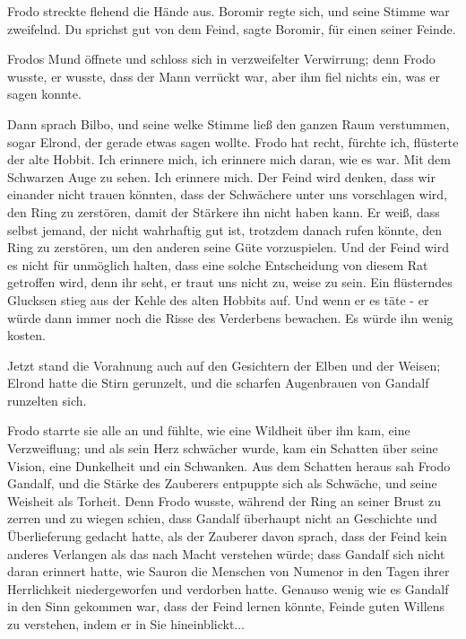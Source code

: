 Frodo streckte flehend die Hände aus. Boromir regte sich, und seine Stimme war
zweifelnd. \glqq{}Du sprichst gut von dem Feind\grqq{}, sagte Boromir, \glqq{}für
einen seiner Feinde.\grqq{}

Frodos Mund öffnete und schloss sich in verzweifelter Verwirrung; denn Frodo
wusste, er wusste, dass der Mann verrückt war, aber ihm fiel nichts ein, was er
sagen konnte.

Dann sprach Bilbo, und seine welke Stimme ließ den ganzen Raum verstummen, sogar
Elrond, der gerade etwas sagen wollte. \glqq{}Frodo hat recht, fürchte
ich\grqq{}, flüsterte der alte Hobbit. \glqq{}Ich erinnere mich, ich erinnere
mich daran, wie es war. Mit dem Schwarzen Auge zu sehen. Ich erinnere mich. Der
Feind wird denken, dass wir einander nicht trauen könnten, dass der Schwächere
unter uns vorschlagen wird, den Ring zu zerstören, damit der Stärkere ihn nicht
haben kann. Er weiß, dass selbst jemand, der nicht wahrhaftig gut ist, trotzdem
danach rufen könnte, den Ring zu zerstören, um den anderen seine Güte
vorzuspielen. Und der Feind wird es nicht für unmöglich halten, dass eine solche
Entscheidung von diesem Rat getroffen wird, denn ihr seht, er traut uns nicht
zu, weise zu sein.\grqq{} Ein flüsterndes Glucksen stieg aus der Kehle des alten
Hobbits auf. \glqq{}Und wenn er es täte - er würde dann immer noch die Risse des
Verderbens bewachen. Es würde ihn wenig kosten.\grqq{}

Jetzt stand die Vorahnung auch auf den Gesichtern der Elben und der Weisen;
Elrond hatte die Stirn gerunzelt, und die scharfen Augenbrauen von Gandalf
runzelten sich.

Frodo starrte sie alle an und fühlte, wie eine Wildheit über ihn kam, eine
Verzweiflung; und als sein Herz schwächer wurde, kam ein Schatten über seine
Vision, eine Dunkelheit und ein Schwanken. Aus dem Schatten heraus sah Frodo
Gandalf, und die Stärke des Zauberers entpuppte sich als Schwäche, und seine
Weisheit als Torheit. Denn Frodo wusste, während der Ring an seiner Brust zu
zerren und zu wiegen schien, dass Gandalf überhaupt nicht an Geschichte und
Überlieferung gedacht hatte, als der Zauberer davon sprach, dass der Feind kein
anderes Verlangen als das nach Macht verstehen würde; dass Gandalf sich nicht
daran erinnert hatte, wie Sauron die Menschen von Numenor in den Tagen ihrer
Herrlichkeit niedergeworfen und verdorben hatte. Genauso wenig wie es Gandalf in
den Sinn gekommen war, dass der Feind lernen könnte, Feinde guten Willens zu
verstehen, indem er in Sie hineinblickt...

